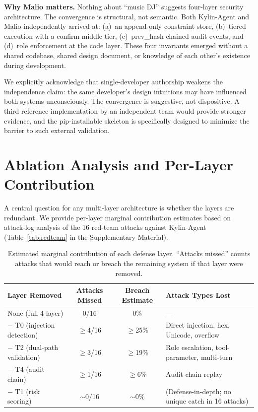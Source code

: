 \documentclass[letterpaper]{article}
\begin{document}
\textbf{Why Malio matters.}  Nothing about ``music DJ'' suggests four-layer
security architecture.  The convergence is structural, not semantic.  Both
Kylin-Agent and Malio independently arrived at: (a)~an append-only constraint
store, (b)~tiered execution with a confirm middle tier, (c)~prev\_hash-chained
audit events, and (d)~role enforcement at the code layer.  These four
invariants emerged without a shared codebase, shared design document, or
knowledge of each other's existence during development.

We explicitly acknowledge that single-developer authorship weakens the
independence claim: the same developer's design intuitions may have influenced
both systems unconsciously.  The convergence is suggestive, not dispositive.
A third reference implementation by an independent team would provide
stronger evidence, and the pip-installable skeleton is specifically designed
to minimize the barrier to such external validation.

\section{Ablation Analysis and Per-Layer Contribution}

A central question for any multi-layer architecture is whether the layers are
redundant.  We provide per-layer marginal contribution estimates based on
attack-log analysis of the 16 red-team attacks against Kylin-Agent
(Table~\ref{tab:redteam} in the Supplementary Material).

\begin{table}[h]
\centering
\caption{Estimated marginal contribution of each defense layer.
         ``Attacks missed'' counts attacks that would reach or breach
         the remaining system if that layer were removed.}
\label{tab:ablation}
\begin{tabular}{lccp{5cm}}
\toprule
Layer Removed & Attacks Missed & Breach Estimate & Attack Types Lost \\
\midrule
None (full 4-layer) & 0/16 & 0\% & --- \\
$-$ T0 (injection detection) & $\ge$4/16 & $\ge$25\% & Direct injection, hex, Unicode, overflow \\
$-$ T2 (dual-path validation) & $\ge$3/16 & $\ge$19\% & Role escalation, tool-parameter, multi-turn \\
$-$ T4 (audit chain) & $\ge$1/16 & $\ge$6\% & Audit-chain replay \\
$-$ T1 (risk scoring) & $\sim$0/16 & $\sim$0\% & (Defense-in-depth; no unique catch in 16 attacks) \\
\bottomrule
\end{tabular}
\end{table}
\end{document}
